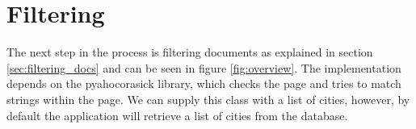\section{Filtering}
The next step in the process is filtering documents as explained in section \ref{sec:filtering_docs} and can be seen in figure \ref{fig:overview}. The implementation depends on the pyahocorasick library, which checks the page and tries to match strings within the page. We can supply this class with a list of cities, however, by default the application will retrieve a list of cities from the database.